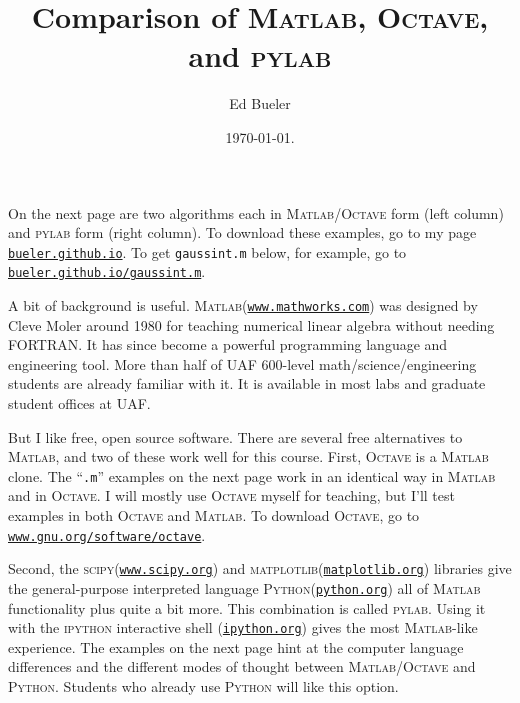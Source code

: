 \documentclass[11pt]{amsart}
\newcommand{\Matlab}{\textsc{Matlab}\xspace}
\newcommand{\Octave}{\textsc{Octave}\xspace}
\newcommand{\python}{\textsc{Python}\xspace}
\newcommand{\pylab}{\textsc{pylab}\xspace}
\newcommand{\scipy}{\textsc{scipy}\xspace}
\newcommand{\matplotlib}{\textsc{matplotlib}\xspace}
\begin{document}
\title{Comparison of \textsc{Matlab}, \textsc{Octave}, and \textsc{pylab}}

\author{Ed Bueler}

\date{\today.}

\maketitle
\normalsize
\thispagestyle{empty}

\newcommand{\hrf}[2]{\href{#1}{\texttt{#2}}}

On the next page are two algorithms each in \Matlab/\Octave form (left column) and \pylab form (right column).  To download these examples, go to my page \hrf{http://bueler.github.io}{bueler.github.io}.  To get \texttt{gaussint.m} below, for example, go to \hrf{http://bueler.github.io/gaussint.m}{bueler.github.io/gaussint.m}.

A bit of background is useful.  \Matlab (\hrf{http://www.mathworks.com/}{www.mathworks.com}) was designed by Cleve Moler around 1980 for teaching numerical linear algebra without needing FORTRAN.  It has since become a powerful programming language and engineering tool.  More than half of UAF 600-level math/science/engineering students are already familiar with it.  It is available in most labs and graduate student offices at UAF.

But I like free, open source software.  There are several free alternatives to \Matlab, and two of these work well for this course.  First, \Octave is a \Matlab clone.  The ``\texttt{.m}'' examples on the next page work in an identical way in \Matlab and in \Octave.  I will mostly use \Octave myself for teaching, but I'll test examples in both \Octave and \Matlab.  To download \Octave, go to 
\hrf{http://www.gnu.org/software/octave/}{www.gnu.org/software/octave}.

Second, the \scipy (\hrf{http://www.scipy.org/}{www.scipy.org}) and \matplotlib (\hrf{http://matplotlib.org/}{matplotlib.org}) libraries give the general-purpose interpreted language \python (\hrf{http://python.org/}{python.org}) all of \Matlab functionality plus quite a bit more.  This combination is called \pylab.  Using it with the \textsc{ipython} interactive shell (\hrf{http://ipython.org/}{ipython.org}) gives the most \Matlab-like experience.  The examples on the next page hint at the computer language differences and the different modes of thought between \Matlab/\Octave and \python.  Students who already use \python will like this option.
\end{document}
